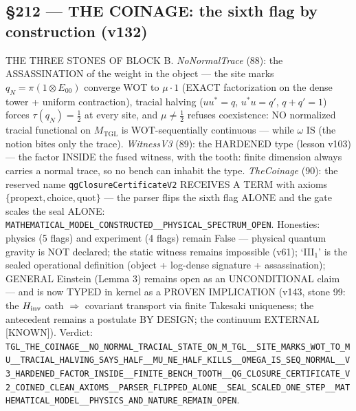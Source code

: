 \documentclass[11pt]{article}
\theoremstyle{definition}\newtheorem{deriv}{Derivation}
\begin{document}
\subsection*{\S212 --- THE COINAGE: the sixth flag by construction (v132)}THE THREE STONES OF BLOCK B. \emph{NoNormalTrace} (88): the ASSASSINATION of the weight in the object --- the site marks $q_N=\pi(1\otimes E_{00})$ converge WOT to $\mu\cdot 1$ (EXACT factorization on the dense tower + uniform contraction), tracial halving ($u u^*=q$, $u^* u=q'$, $q+q'=1$) forces $\tau(q_N)=\tfrac12$ at every site, and $\mu\neq\tfrac12$ refuses coexistence: NO normalized tracial functional on $M_{\mathrm{TGL}}$ is WOT-sequentially continuous --- while $\omega$ IS (the notion bites only the trace). \emph{WitnessV3} (89): the HARDENED type (lesson v103) --- the factor INSIDE the fused witness, with the tooth: finite dimension always carries a normal trace, so no bench can inhabit the type. \emph{TheCoinage} (90): the reserved name \texttt{qgClosureCertificateV2} RECEIVES A TERM with axioms $\{\mathrm{propext},\mathrm{choice},\mathrm{quot}\}$ --- the parser flips the sixth flag ALONE and the gate scales the seal ALONE: \texttt{MATHEMATICAL\_MODEL\_CONSTRUCTED\_\_PHYSICAL\_SPECTRUM\_OPEN}. Honesties: physics (5 flags) and experiment (4 flags) remain False --- physical quantum gravity is NOT declared; the static witness remains impossible (v61); `III$_1$' is the sealed operational definition (object + log-dense signature + assassination); GENERAL Einstein (Lemma 3) remains open as an UNCONDITIONAL claim --- and is now TYPED in kernel as a PROVEN IMPLICATION (v143, stone 99: the $H_{\rm inv}$ oath $\Rightarrow$ covariant transport via finite Takesaki uniqueness; the antecedent remains a postulate BY DESIGN; the continuum EXTERNAL [KNOWN]). Verdict: \texttt{TGL\_THE\_COINAGE\_\_NO\_NORMAL\_TRACIAL\_STATE\_ON\_M\_TGL\_\_SITE\_MARKS\_WOT\_TO\_MU\_\_TRACIAL\_HALVING\_SAYS\_HALF\_\_MU\_NE\_HALF\_KILLS\_\_OMEGA\_IS\_SEQ\_NORMAL\_\_V3\_HARDENED\_FACTOR\_INSIDE\_\_FINITE\_BENCH\_TOOTH\_\_QG\_CLOSURE\_CERTIFICATE\_V2\_COINED\_CLEAN\_AXIOMS\_\_PARSER\_FLIPPED\_ALONE\_\_SEAL\_SCALED\_ONE\_STEP\_\_MATHEMATICAL\_MODEL\_\_PHYSICS\_AND\_NATURE\_REMAIN\_OPEN}.
\end{document}
